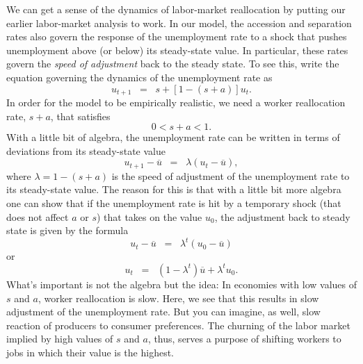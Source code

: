 We can get a sense of the dynamics of labor-market reallocation
 by putting our earlier labor-market analysis to work.
In our model, the accession and separation rates also govern the response of the unemployment rate to a shock that pushes unemployment above (or below) its steady-state value. In particular, these rates govern the {\it speed of adjustment} back to the steady state. To see this, write the equation governing the dynamics of the unemployment rate as
\[
    u_{t+1} \;\;=\;\; s+ [1-(s+a)] u_{t} .
\]
In order for the model to be empirically realistic, we need a worker reallocation rate, $s+a$, that satisfies
\[0<s+a<1.\]
With a little bit of algebra, the unemployment rate can be written in terms of deviations from its steady-state value
\[
    u_{t+1}-\overline{u} \;\;=\;\; \lambda (u_t-\overline{u}) ,
\]
where $\lambda=1-(s+a)$ is the speed of adjustment 
 of the unemployment rate to its steady-state value. The reason for this is that with a little bit more algebra one can show that if the unemployment rate is hit by a temporary shock (that does not affect $a$ or $s$) that takes on the value $u_0$, the adjustment back to steady state is given by the formula
\[
    u_t-\overline{u} \;\;=\;\; \lambda^{t}(u_0-\overline{u})
\]
or
\[
    u_t \;\;=\;\; (1-\lambda^{t})\overline{u}+\lambda^{t}u_0 .
\]
What's important is not the algebra but the idea:
In economies with low values of $s$ and $a$,
worker reallocation is slow.
Here, we see that this results in slow adjustment of the unemployment rate.
But you can imagine, as well, slow reaction of producers to consumer
preferences.
The churning of the labor market implied by high values of $s$ and $a$,
thus, serves a purpose of shifting workers to jobs in which their value is the highest.



\begin{comment}
Notice that a high separation rate $s$ has two important effects on the economy: it (i)~raises the steady state unemployment rate, but (ii) helps the economy respond quickly to temporary shocks to unemployment. On the other hand, a high accession rate \index{accession rate}
 $a$ has two unambiguously good effects: it (i) reduces the steady state unemployment rate, and (ii) helps the economy respond quickly to temporary shocks. This suggests that one way to think about the European unemployment problem is as an economy with an $s$ that is moderate and an $a$ that is low.
\end{comment}

